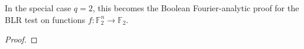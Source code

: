 \begin{theorem}
\label{thm:boolean-special-case}
\leanok
In the special case $q=2$, this becomes the Boolean
  Fourier-analytic proof for the BLR test on functions
  $f : \mathbb{F}_2^n \to \mathbb{F}_2$.
\end{theorem}
\begin{proof}
\end{proof}
